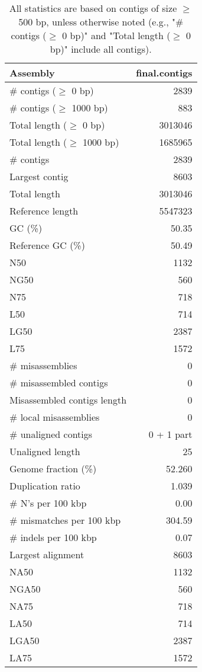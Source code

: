 \documentclass[12pt,a4paper]{article}
\begin{document}
\begin{table}[ht]
\begin{center}
\caption{All statistics are based on contigs of size $\geq$ 500 bp, unless otherwise noted (e.g., "\# contigs ($\geq$ 0 bp)" and "Total length ($\geq$ 0 bp)" include all contigs).}
\begin{tabular}{|l*{1}{|r}|}
\hline
Assembly & final.contigs \\ \hline
\# contigs ($\geq$ 0 bp) & 2839 \\ \hline
\# contigs ($\geq$ 1000 bp) & 883 \\ \hline
Total length ($\geq$ 0 bp) & 3013046 \\ \hline
Total length ($\geq$ 1000 bp) & 1685965 \\ \hline
\# contigs & 2839 \\ \hline
Largest contig & 8603 \\ \hline
Total length & 3013046 \\ \hline
Reference length & 5547323 \\ \hline
GC (\%) & 50.35 \\ \hline
Reference GC (\%) & 50.49 \\ \hline
N50 & 1132 \\ \hline
NG50 & 560 \\ \hline
N75 & 718 \\ \hline
L50 & 714 \\ \hline
LG50 & 2387 \\ \hline
L75 & 1572 \\ \hline
\# misassemblies & 0 \\ \hline
\# misassembled contigs & 0 \\ \hline
Misassembled contigs length & 0 \\ \hline
\# local misassemblies & 0 \\ \hline
\# unaligned contigs & 0 + 1 part \\ \hline
Unaligned length & 25 \\ \hline
Genome fraction (\%) & 52.260 \\ \hline
Duplication ratio & 1.039 \\ \hline
\# N's per 100 kbp & 0.00 \\ \hline
\# mismatches per 100 kbp & 304.59 \\ \hline
\# indels per 100 kbp & 0.07 \\ \hline
Largest alignment & 8603 \\ \hline
NA50 & 1132 \\ \hline
NGA50 & 560 \\ \hline
NA75 & 718 \\ \hline
LA50 & 714 \\ \hline
LGA50 & 2387 \\ \hline
LA75 & 1572 \\ \hline
\end{tabular}
\end{center}
\end{table}
\end{document}
